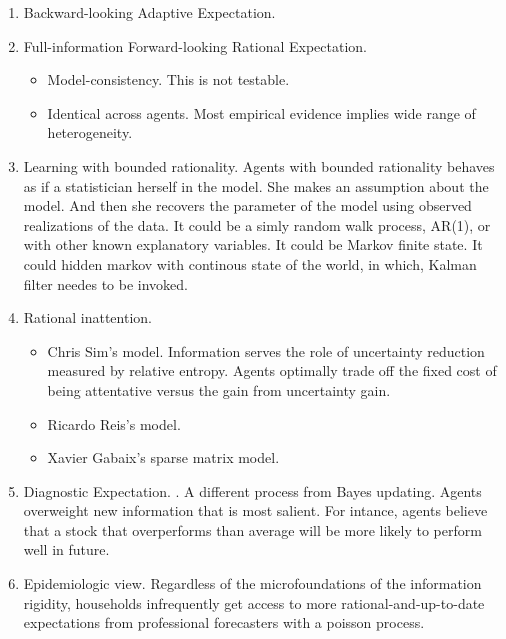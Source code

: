 \documentclass[]{article}
\begin{document}
\begin{enumerate}
	\item Backward-looking Adaptive Expectation. 
	
	\item Full-information Forward-looking Rational Expectation.  
	\begin{itemize}
		\item Model-consistency. This is not testable. 
		\item Identical across agents. Most empirical evidence implies wide range of heterogeneity.  \cite{mankiw2003disagreement, coibion2012can} 
	\end{itemize}

\item Learning with bounded rationality.  \cite{evans2012learning} Agents with bounded rationality behaves as if a statistician herself in the model. She makes an assumption about the model. And then she recovers the parameter of the model using observed realizations of the data. It could be a simly random walk process, AR(1), or with other known explanatory variables. It could be Markov finite state. It could hidden markov with continous state of the world, in which, Kalman filter needes to be invoked.

\item Rational inattention. 
\begin{itemize}
	\item Chris Sim's model.\cite{sims2003implications} Information serves the role of uncertainty reduction measured by relative entropy. Agents optimally trade off the fixed cost of being attentative versus the gain from uncertainty gain.   
	\item Ricardo Reis's model. \cite{reis2006inattentive}
	\item Xavier Gabaix's sparse matrix model. \cite{gabaix2014sparsity}
\end{itemize}

\item Diagnostic Expectation. \cite{bordalo2018diagnostic}. A different process from Bayes updating. Agents overweight new information that is most salient. For intance, agents believe that a stock that overperforms than average will be more likely to perform well in future. 


\item Epidemiologic view. \cite{carroll2003macroeconomic} Regardless of the microfoundations of the information rigidity, households infrequently get access to more rational-and-up-to-date expectations from professional forecasters with a poisson process. 


\end{enumerate}
\end{document}
